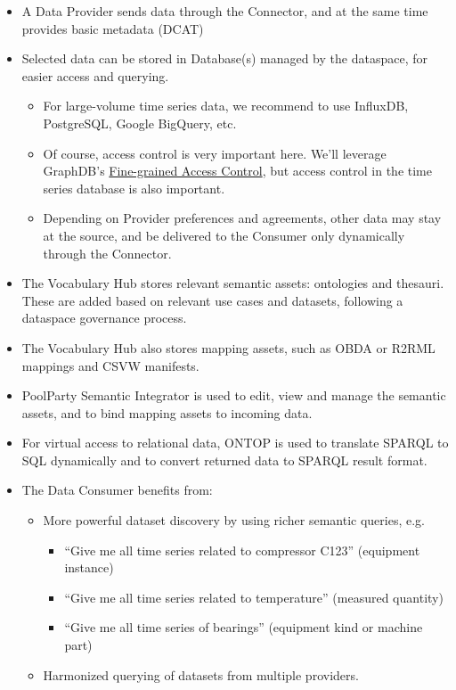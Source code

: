 \documentclass[manuscript,screen]{acmart}
\providecommand{\tightlist}{%
  \setlength{\itemsep}{0pt}\setlength{\parskip}{0pt}}\usepackage{longtable,booktabs,array}
\begin{document}
\begin{itemize}
\tightlist
\item
  A Data Provider sends data through the Connector, and at the same time
  provides basic metadata (DCAT)
\item
  Selected data can be stored in Database(s) managed by the dataspace,
  for easier access and querying.

  \begin{itemize}
  \tightlist
  \item
    For large-volume time series data, we recommend to use InfluxDB,
    PostgreSQL, Google BigQuery, etc.
  \item
    Of course, access control is very important here. We'll leverage
    GraphDB's
    \href{https://graphdb.ontotext.com/documentation/10.6/fine-grained-access-control.html}{Fine-grained
    Access Control}, but access control in the time series database is
    also important.
  \item
    Depending on Provider preferences and agreements, other data may
    stay at the source, and be delivered to the Consumer only
    dynamically through the Connector.
  \end{itemize}
\item
  The Vocabulary Hub stores relevant semantic assets: ontologies and
  thesauri. These are added based on relevant use cases and datasets,
  following a dataspace governance process.
\item
  The Vocabulary Hub also stores mapping assets, such as OBDA or R2RML
  mappings and CSVW manifests.
\item
  PoolParty Semantic Integrator is used to edit, view and manage the
  semantic assets, and to bind mapping assets to incoming data.
\item
  For virtual access to relational data, ONTOP is used to translate
  SPARQL to SQL dynamically and to convert returned data to SPARQL
  result format.
\item
  The Data Consumer benefits from:

  \begin{itemize}
  \tightlist
  \item
    More powerful dataset discovery by using richer semantic queries,
    e.g.

    \begin{itemize}
    \tightlist
    \item
      ``Give me all time series related to compressor C123'' (equipment
      instance)
    \item
      ``Give me all time series related to temperature'' (measured
      quantity)
    \item
      ``Give me all time series of bearings'' (equipment kind or machine
      part)
    \end{itemize}
  \item
    Harmonized querying of datasets from multiple providers.
  \end{itemize}
\end{itemize}
\end{document}
